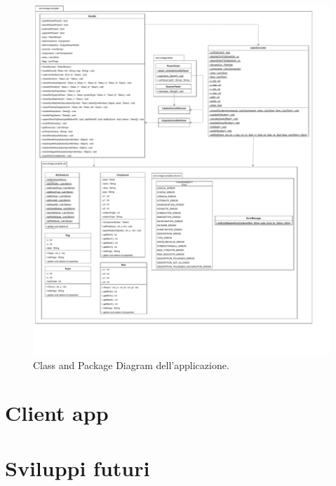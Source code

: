 \begin{figure}[h!]
	\centering
	\includegraphics[width=\textwidth]{./ImageFiles/class and package diagram.pdf}
	\caption{Class and Package Diagram dell'applicazione.}
	\label{fig:class_diagram}
\end{figure}

\section{Client app}

\section{Sviluppi futuri}
